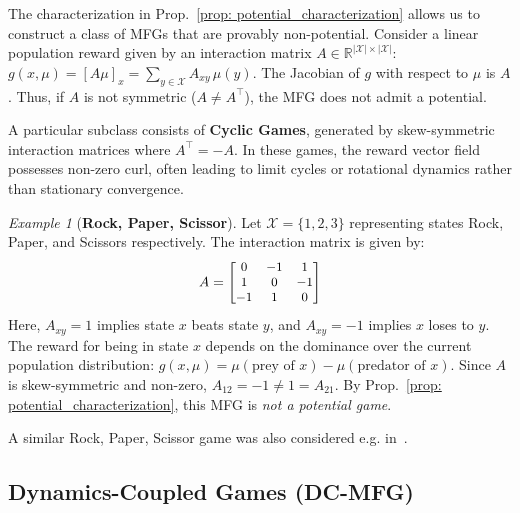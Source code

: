 \documentclass[10pt,twocolumn,letterpaper]{article}
\theoremstyle{definition}
\theoremstyle{remark}
\newtheorem{example}{Example}
\newcommand{\states}{\mathcal{X}}
\begin{document}
The characterization in Prop.~\ref{prop: potential_characterization} allows us to construct a class of MFGs that are provably non-potential. 
Consider a linear population reward given by an interaction matrix $A \in \mathbb R^{|\states| \times |\states|}$:
$
g(x, \mu) = [A \mu]_x = \sum_{y \in \states} A_{xy} \, \mu(y).
$
The Jacobian of $g$ with respect to $\mu$ is $A$. Thus, if $A$ is not symmetric ($A \neq A^\top$), the MFG does not admit a potential. 

A particular subclass consists of \textbf{Cyclic Games}, generated by skew-symmetric interaction matrices where $A^\top = -A$. In these games, the reward vector field possesses non-zero curl, often leading to limit cycles or rotational dynamics rather than stationary convergence.
\begin{example}[\textbf{Rock, Paper, Scissor}]
    \label{ex: RPS}
    Let $\states = \{1, 2, 3\}$ representing states Rock, Paper, and Scissors respectively. The interaction matrix is given by:
    \[
        A = \small\begin{bmatrix}
             0 & -1 &  1 \\
             1 &  0 & -1 \\
            -1 &  1 &  0
        \end{bmatrix}
    \]
    Here, $A_{xy} = 1$ implies state $x$ beats state $y$, and $A_{xy} = -1$ implies $x$ loses to $y$. The reward for being in state $x$ depends on the dominance over the current population distribution:
    \(
        g(x, \mu) = \mu(\text{prey of } x) - \mu(\text{predator of } x).
    \)
    Since $A$ is skew-symmetric and non-zero, $A_{12} = -1 \neq 1 = A_{21}$. By Prop.~\ref{prop: potential_characterization}, this MFG is \emph{not a potential game}.
\end{example}
A similar Rock, Paper, Scissor game was also considered e.g. in~\citep{muller2022learningpsro}.

\subsection{Dynamics-Coupled Games (DC-MFG)}
\end{document}
